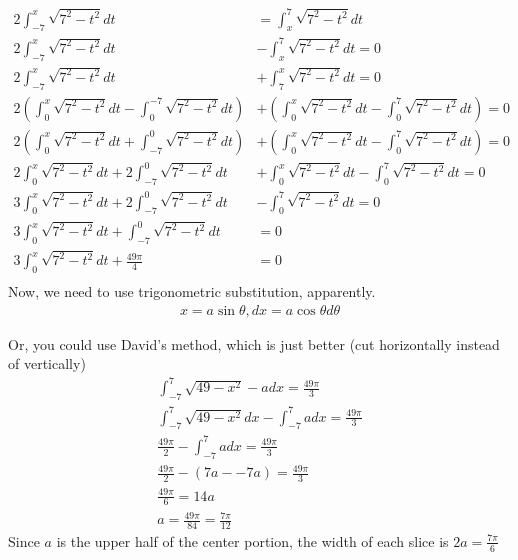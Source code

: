 \documentclass[letterpaper]{article}
\begin{document}
\[\begin{aligned}
  2\int_{-7}^{x} \sqrt{7^2 - t^2} dt &= \int_{x}^{7} \sqrt{7^2 - t^2} dt\\
  2\int_{-7}^{x} \sqrt{7^2 - t^2} dt &- \int_{x}^{7} \sqrt{7^2 - t^2} dt = 0\\
  2\int_{-7}^{x} \sqrt{7^2 - t^2} dt &+ \int_{7}^{x} \sqrt{7^2 - t^2} dt = 0\\
  2\left( \int_{0}^{x} \sqrt{7^2 - t^2} dt - \int_{0}^{-7} \sqrt{7^2 - t^2} dt \right)  &+\left( \int_{0}^{x} \sqrt{7^2 - t^2} dt - \int_{0}^{7} \sqrt{7^2 - t^2} dt \right)  = 0\\
  2\left( \int_{0}^{x} \sqrt{7^2 - t^2} dt + \int_{-7}^{0} \sqrt{7^2 - t^2} dt \right)  &+\left( \int_{0}^{x} \sqrt{7^2 - t^2} dt - \int_{0}^{7} \sqrt{7^2 - t^2} dt \right)  = 0\\
  2\int_{0}^{x} \sqrt{7^2 - t^2} dt + 2\int_{-7}^{0} \sqrt{7^2 - t^2} dt  &+\int_{0}^{x} \sqrt{7^2 - t^2} dt - \int_{0}^{7} \sqrt{7^2 - t^2} dt = 0\\
  3\int_{0}^{x} \sqrt{7^2 - t^2} dt + 2\int_{-7}^{0} \sqrt{7^2 - t^2} dt  &- \int_{0}^{7} \sqrt{7^2 - t^2} dt = 0\\
  3\int_{0}^{x} \sqrt{7^2 - t^2} dt + \int_{-7}^{0} \sqrt{7^2 - t^2} dt &= 0\\
  3\int_{0}^{x} \sqrt{7^2 - t^2} dt + \frac{49\pi}{4}  &= 0\\
  \end{aligned}\]
Now, we need to use trigonometric substitution, apparently.
\[\begin{aligned}
  x = a \sin \theta, dx = a \cos  \theta d \theta
  \end{aligned}\]


Or, you could use David's method, which is just better (cut horizontally instead of vertically)
\[\begin{aligned}
  \int_{-7}^{7} \sqrt{49-x^2} - a dx = \frac{49\pi }{3}\\
  \int_{-7}^{7} \sqrt{49-x^2} dx -\int_{-7}^{7}  a dx = \frac{49\pi }{3}\\
  \frac{49\pi }{2} -\int_{-7}^{7}  a dx = \frac{49\pi }{3}\\
  \frac{49\pi }{2} -\left( 7a - -7a \right)  = \frac{49\pi }{3}\\
  \frac{49\pi }{6} = 14a\\
  a = \frac{49\pi }{84} = \frac{7\pi }{12}
  \end{aligned}\]
Since \(a\) is the upper half of the center portion, the width of each slice is \(2a = \frac{7 \pi}{6}\)
\end{document}
